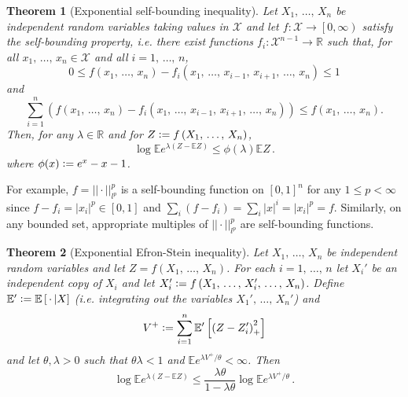 \documentclass[reqno]{amsproc}
\newtheorem{theorem}{Theorem}
\newcommand{\defeq}{\vcentcolon=} %
\newcommand{\R}{\mathbb{R}}
\newcommand{\E}{\mathbb{E}} %
\begin{document}
\begin{theorem}[Exponential self-bounding inequality]
	\label{thm:exp_self_bound_ineq}
	Let $X_1,\,\dots,\,X_n$ be independent random variables taking values in $ \mathcal{X} $ and let $f: \mathcal{X} \to \left[0,\infty\right)$ satisfy the self-bounding property,
	i.e. there exist functions $f_i : \mathcal{X}^{n-1} \to \R$ such that, for all $x_1,\,\dots,\,x_n\in \mathcal{X} $ and all $i=1,\,\dots,\,n$,
	\begin{equation*}
		0 \leq f \left( x_1,\,\dots,\,x_n \right) - f_i \left( x_1,\,\dots,\,x_{i-1},\,x_{i+1},\,\dots,\,x_n \right) \leq 1
	\end{equation*}
	and
	\begin{equation*}
		\sum_{i=1}^n \left(
			f \left( x_1,\,\dots,\,x_n \right) - f_i \left( x_1,\,\dots,\,x_{i-1},\,x_{i+1},\,\dots,\,x_n \right)
		\right) \leq f \left( x_1,\,\dots,\,x_n \right).
	\end{equation*}
	Then, for any $\lambda\in\R$ and for $Z \defeq f \left( X_1,\,\dots,\,X_n \right)$,
	\begin{equation*}
		\log \E e^{\lambda \left( Z-\E Z \right)} \leq \phi(\lambda) \E Z\,.
	\end{equation*}
	where $\phi(x) \defeq e^x - x - 1$.
\end{theorem}
	For example, $f = {||\cdot||}_{l^p}^p$ is a self-bounding function on ${ \left[ 0,1 \right] }^n$ for any $1\leq p < \infty$ since 
		$f-f_i = {|x_i|}^p \in \left[ 0,1 \right]$
	and
		$\sum_i \left( f-f_i \right) = \sum_i {|x|}^i = {|x_i|}^p = f$.
	Similarly, on any bounded set, appropriate multiples of ${||\cdot||}_{l^p}^p$ are self-bounding functions.
\begin{theorem}[Exponential Efron-Stein inequality]
	\label{thm:exp_efron_stein}
	Let $X_1,\,\dots,\,X_n$ be independent random variables and let $Z = f \left( X_1,\,\dots,\,X_n \right)$.
	For each $i=1,\,\dots,\,n$ let $X_i'$ be an independent copy of $X_i$ and let $X_i' \defeq f \left( X_1,\,\dots,\,X_i',\,\dots,\,X_n \right)$.
	Define $\E' \defeq \E \left[ \,\cdot\, | X \right]$ (i.e. integrating out the variables $X_1',\,\dots,\,X_n'$) and
	\begin{equation*}
		V^+ \defeq \sum_{i=1}^n \E' \left[ {\left( Z - Z_i' \right)}_+^2 \right]
	\end{equation*}
	and let $\theta, \lambda > 0$ such that $\theta\lambda < 1$ and $\E e^{\lambda V^+ / \theta} < \infty$. Then
	\begin{equation*}
		\log\E e^{\lambda \left( Z - \E Z \right)} \leq \frac{\lambda\theta}{1-\lambda\theta} \log\E e^{\lambda V^+ / \theta}\,.
	\end{equation*}
\end{theorem}
\newpage
\end{document}
